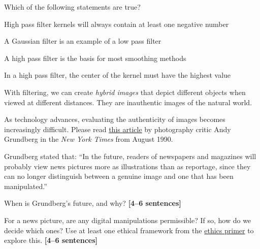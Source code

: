 \documentclass{csci1430}
\begin{document}
\pagebreak

\begin{subquestion}[points=2]
Which of the following statements are true?
\end{subquestion}

\begin{answerlist}
\item High pass filter kernels will always contain at least one negative number
\item A Gaussian filter is an example of a low pass filter
\item A high pass filter is the basis for most smoothing methods
\item In a high pass filter, the center of the kernel must have the highest value
\end{answerlist}


\pagebreak

\begin{question}[points=14,drawbox=false]
With filtering, we can create \emph{hybrid images} that depict different objects when viewed at different distances. They are inauthentic images of the natural world.

As technology advances, evaluating the authenticity of images becomes increasingly difficult. Please read \href{https://www.nytimes.com/1990/08/12/arts/photography-view-ask-it-no-questions-the-camera-can-lie.html}{this article} by photography critic Andy Grundberg in the \emph{New York Times} from August 1990.

Grundberg stated that: ``In the future, readers of newspapers and magazines will probably view news pictures more as illustrations than as reportage, since they can no longer distinguish between a genuine image and one that has been manipulated.''
\end{question}

\begin{subquestion}[points=4]
When is Grundberg's future, and why? \textbf{[4--6 sentences]}
\end{subquestion}

\begin{answer}[height=11]

\end{answer}

\begin{subquestion}[points=4]
For a news picture, are any digital manipulations permissible? If so, how do we decide which ones? Use at least one ethical framework from the \href{https://browncsci1430.github.io/resources/ethics_primer/}{ethics primer} to explore this. \textbf{[4--6 sentences]}
\end{subquestion}
\end{document}
